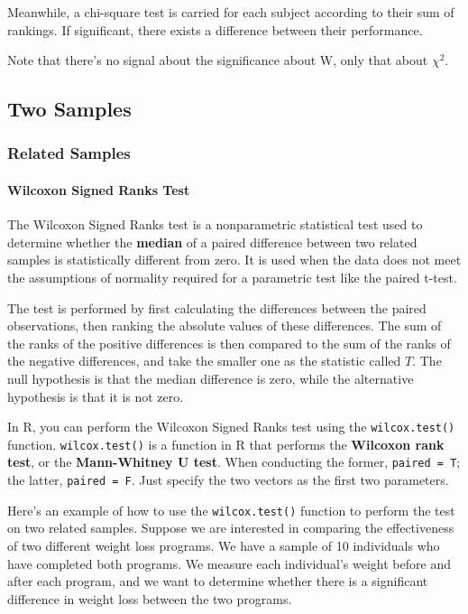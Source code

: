 \documentclass[
]{ctexart}
\begin{document}
Meanwhile, a chi-square test is carried for each subject according to
their sum of rankings. If significant, there exists a difference between
their performance.

Note that there's no signal about the significance about W, only that
about \(\chi^2\).

\hypertarget{two-samples}{%
\subsection{Two Samples}\label{two-samples}}

\hypertarget{related-samples}{%
\subsubsection{Related Samples}\label{related-samples}}

\hypertarget{wilcoxon-signed-ranks-test}{%
\paragraph{Wilcoxon Signed Ranks
Test}\label{wilcoxon-signed-ranks-test}}

The Wilcoxon Signed Ranks test is a nonparametric statistical test used
to determine whether the \textbf{median} of a paired difference between
two related samples is statistically different from zero. It is used
when the data does not meet the assumptions of normality required for a
parametric test like the paired t-test.

The test is performed by first calculating the differences between the
paired observations, then ranking the absolute values of these
differences. The sum of the ranks of the positive differences is then
compared to the sum of the ranks of the negative differences, and take
the smaller one as the statistic called \(T\). The null hypothesis is
that the median difference is zero, while the alternative hypothesis is
that it is not zero.

In R, you can perform the Wilcoxon Signed Ranks test using the
\texttt{wilcox.test()} function. \texttt{wilcox.test()} is a function in
R that performs the \textbf{Wilcoxon rank test}, or the
\textbf{Mann-Whitney U test}. When conducting the former,
\texttt{paired\ =\ T}; the latter, \texttt{paired\ =\ F}. Just specify
the two vectors as the first two parameters.

Here's an example of how to use the \texttt{wilcox.test()} function to
perform the test on two related samples. Suppose we are interested in
comparing the effectiveness of two different weight loss programs. We
have a sample of 10 individuals who have completed both programs. We
measure each individual's weight before and after each program, and we
want to determine whether there is a significant difference in weight
loss between the two programs.
\end{document}
